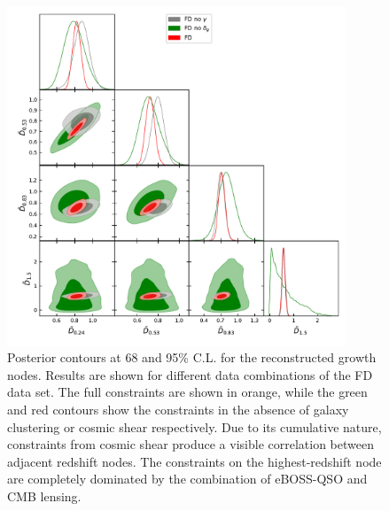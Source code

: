 \documentclass[a4paper,11pt]{article}
\newcommand{\eboss}{eBOSS-QSO\xspace}
\newcommand{\alld}{FD\xspace}
\begin{document}
      \begin{figure}
        \centering
        \includegraphics[width=0.9\textwidth]{figures/FD_dpk.pdf}
        \caption{Posterior contours at 68 and 95\% C.L. for the reconstructed growth nodes. Results are shown for different data combinations of the \alld data set. The full constraints are shown in orange, while the green and red contours show the constraints in the absence of galaxy clustering or cosmic shear respectively. Due to its cumulative nature, constraints from cosmic shear produce a visible correlation between adjacent redshift nodes. The constraints on the highest-redshift node are completely dominated by the combination of \eboss and CMB lensing.}\label{fig:DES_dpk}
      \end{figure}
\end{document}
